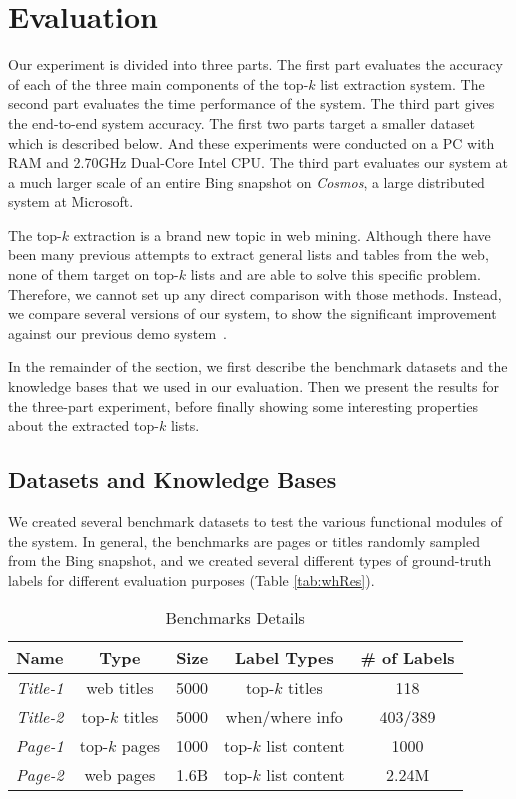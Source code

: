 \section{Evaluation}
\label{sec:eval}
Our experiment is divided into three parts.
The first part evaluates the accuracy of each of the three main components of
the top-$k$ list extraction system. The second part evaluates the time
performance of the system. The third part gives the end-to-end system
accuracy. The first two parts target a smaller dataset
which is described below. And these experiments were
conducted on a PC with  RAM and 2.70GHz Dual-Core Intel CPU.
The third part evaluates our system at a much larger scale of an entire
Bing snapshot on {\em Cosmos}, a large distributed system at Microsoft.

The top-$k$ extraction is a brand new topic in web mining.
Although there have been many previous attempts
to extract general lists and tables from the web, none of them target
on top-$k$ lists and are able to solve this specific problem. Therefore, we
cannot set up any direct comparison with those methods.  Instead,
we compare several versions of our system, to show the significant
improvement against our previous demo system~\cite{ZZX2012KDD}.

In the remainder of the section, we first describe the benchmark
datasets and the knowledge bases that we used in our evaluation.
Then we present the results for the three-part experiment,
before finally showing some interesting properties about the extracted
top-$k$ lists.

\subsection{Datasets and Knowledge Bases}
We created several benchmark datasets to test the various functional modules
of the system. In general, the benchmarks are pages or titles randomly
sampled from the Bing snapshot, and we created several different types of
ground-truth labels for different evaluation purposes (Table \ref{tab:whRes}).

\begin{table}
\centering
\caption{Benchmarks Details}
\begin{tabular}{|c||c|c|c|c|}
\hline
Name& Type & Size & Label Types & \# of Labels\\\hline
\emph{Title-1} & web titles & 5000 & top-$k$ titles & 118\\
\emph{Title-2} & top-$k$ titles & 5000 & when/where info & 403/389\\
\emph{Page-1} & top-$k$ pages & 1000 & top-$k$ list content & 1000\\
\emph{Page-2} & web pages & 1.6B & top-$k$ list content & 2.24M\\
\hline
\end{tabular}

\label{tab:benchmark}
\end{table}

